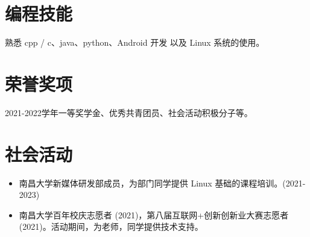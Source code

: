 \documentclass{resume}
\begin{document}
\section{编程技能}
熟悉 cpp / c、java、python、Android 开发 以及 Linux 系统的使用。

\section{荣誉奖项}
2021-2022学年一等奖学金、优秀共青团员、社会活动积极分子等。


\section{社会活动}
\begin{itemize}[parsep=0.2ex]
  \item 南昌大学新媒体研发部成员，为部门同学提供 Linux 基础的课程培训。(2021-2023)
  \item 南昌大学百年校庆志愿者 (2021)，第八届互联网+创新创新业大赛志愿者(2021)。活动期间，为老师，同学提供技术支持。
\end{itemize}
\end{document}
